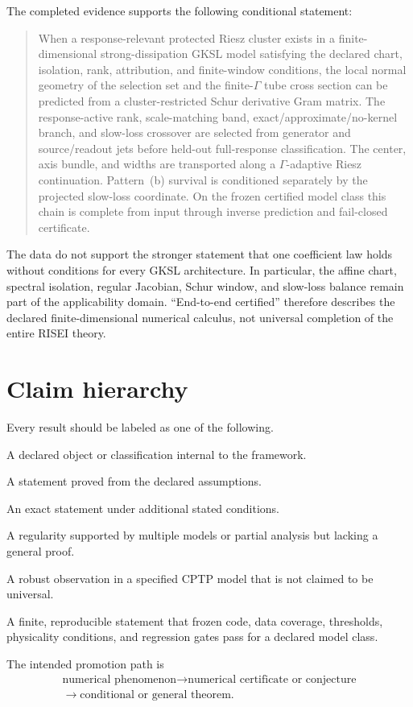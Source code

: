 \documentclass[11pt]{article}
\theoremstyle{definition}
\theoremstyle{remark}
\begin{document}
The completed evidence supports the following conditional statement:
\begin{quote}
When a response-relevant protected Riesz cluster exists in a finite-dimensional strong-dissipation GKSL model satisfying the declared chart, isolation, rank, attribution, and finite-window conditions, the local normal geometry of the selection set and the finite-$\Gamma$ tube cross section can be predicted from a cluster-restricted Schur derivative Gram matrix.  The response-active rank, scale-matching band, exact/approximate/no-kernel branch, and slow-loss crossover are selected from generator and source/readout jets before held-out full-response classification.  The center, axis bundle, and widths are transported along a $\Gamma$-adaptive Riesz continuation.  Pattern~(b) survival is conditioned separately by the projected slow-loss coordinate.  On the frozen certified model class this chain is complete from input through inverse prediction and fail-closed certificate.
\end{quote}
The data do not support the stronger statement that one coefficient law holds without conditions for every GKSL architecture. In particular, the affine chart, spectral isolation, regular Jacobian, Schur window, and slow-loss balance remain part of the applicability domain.  ``End-to-end certified'' therefore describes the declared finite-dimensional numerical calculus, not universal completion of the entire RISEI theory.

\section{Claim hierarchy}

Every result should be labeled as one of the following.
\begin{description}[leftmargin=3.4em,style=nextline]
  \item[Definition.] A declared object or classification internal to the framework.
  \item[Exact.] A statement proved from the declared assumptions.
  \item[Conditional.] An exact statement under additional stated conditions.
  \item[Conjecture.] A regularity supported by multiple models or partial analysis but lacking a general proof.
  \item[Numerical phenomenon.] A robust observation in a specified CPTP model that is not claimed to be universal.
  \item[Numerical certificate.] A finite, reproducible statement that frozen code, data coverage, thresholds, physicality conditions, and regression gates pass for a declared model class.
\end{description}
The intended promotion path is
\begin{equation}
\begin{gathered}
\text{numerical phenomenon}
\longrightarrow
\text{numerical certificate or conjecture}\\
\longrightarrow
\text{conditional or general theorem}.
\end{gathered}
\end{equation}
\end{document}
